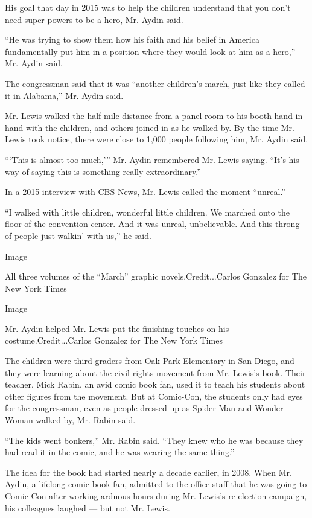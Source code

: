 His goal that day in 2015 was to help the children understand that you
don't need super powers to be a hero, Mr. Aydin said.

``He was trying to show them how his faith and his belief in America
fundamentally put him in a position where they would look at him as a
hero,'' Mr. Aydin said.

The congressman said that it was ``another children's march, just like
they called it in Alabama,'' Mr. Aydin said.

Mr. Lewis walked the half-mile distance from a panel room to his booth
hand-in-hand with the children, and others joined in as he walked by. By
the time Mr. Lewis took notice, there were close to 1,000 people
following him, Mr. Aydin said.

```This is almost too much,''' Mr. Aydin remembered Mr. Lewis saying.
``It's his way of saying this is something really extraordinary.''

In a 2015 interview with
\href{https://www.cbsnews.com/news/rep-john-lewis-called-real-life-superhero-fans-inspired-march-comic-books/}{CBS
News}, Mr. Lewis called the moment ``unreal.''

``I walked with little children, wonderful little children. We marched
onto the floor of the convention center. And it was unreal,
unbelievable. And this throng of people just walkin' with us,'' he said.

Image

All three volumes of the ``March'' graphic novels.Credit...Carlos
Gonzalez for The New York Times

Image

Mr. Aydin helped Mr. Lewis put the finishing touches on his
costume.Credit...Carlos Gonzalez for The New York Times

The children were third-graders from Oak Park Elementary in San Diego,
and they were learning about the civil rights movement from Mr. Lewis's
book. Their teacher, Mick Rabin, an avid comic book fan, used it to
teach his students about other figures from the movement. But at
Comic-Con, the students only had eyes for the congressman, even as
people dressed up as Spider-Man and Wonder Woman walked by, Mr. Rabin
said.

``The kids went bonkers,'' Mr. Rabin said. ``They knew who he was
because they had read it in the comic, and he was wearing the same
thing.''

The idea for the book had started nearly a decade earlier, in 2008. When
Mr. Aydin, a lifelong comic book fan, admitted to the office staff that
he was going to Comic-Con after working arduous hours during Mr. Lewis's
re-election campaign, his colleagues laughed --- but not Mr. Lewis.

